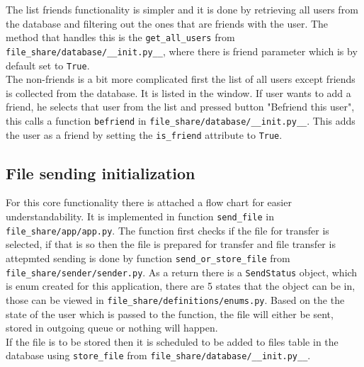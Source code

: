 The list friends functionality is simpler and it is done by retrieving all users from the database and filtering out the ones that are friends with the user.
The method that handles this is the \texttt{get\_all\_users} from \texttt{file\_share/database/\_\_init.py\_\_}, where there is friend parameter which is by default set to \texttt{True}.\\
The non-friends is a bit more complicated first the list of all users except friends is collected from the database. It is listed in the window. If user wants 
to add a friend, he selects that user from the list and pressed button "Befriend this user", this calls a function \texttt{befriend} in \texttt{file\_share/database/\_\_init.py\_\_}.
This adds the user as a friend by setting the \texttt{is\_friend} attribute to \texttt{True}.

\subsection{File sending initialization}
For this core functionality there is attached a flow chart for easier understandability. It is implemented in function \texttt{send\_file} in \texttt{file\_share/app/app.py}.
The function first checks if the file for transfer is selected, if that is so then the file is prepared for transfer and file transfer is attepmted sending is done by 
function \texttt{send\_or\_store\_file} from \texttt{file\_share/sender/sender.py}. As a return there is a \texttt{SendStatus} object, which is enum created for this application,
there are 5 states that the object can be in, those can be viewed in \texttt{file\_share/definitions/enums.py}. Based on the the state of the user which is passed to the function,
the file will either be sent, stored in outgoing queue or nothing will happen.\\

If the file is to be stored then it is scheduled to be added to files table in the database using \texttt{store\_file} from \texttt{file\_share/database/\_\_init.py\_\_}.

